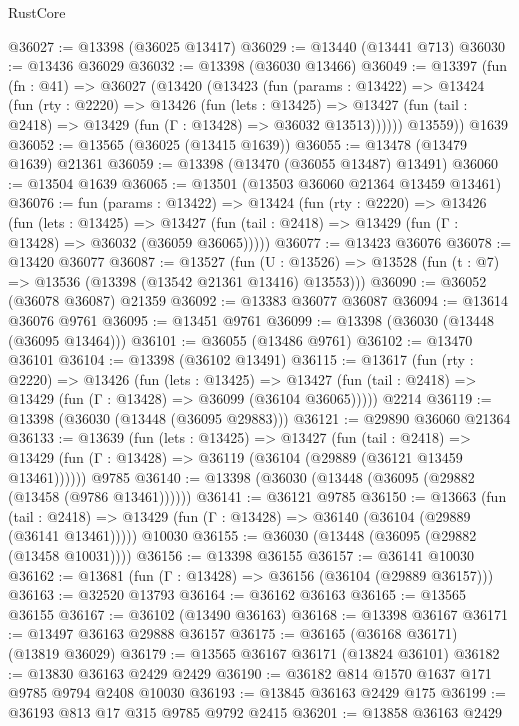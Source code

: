 \begin{lexlean}{RustCore}
\begin{coremodule}
@36027 := @13398 (@36025 @13417)
@36029 := @13440 (@13441 @713)
@36030 := @13436 @36029
@36032 := @13398 (@36030 @13466)
@36049 := @13397
    (fun (fn : @41) =>
    @36027
      (@13420
        (@13423
          (fun (params : @13422) =>
          @13424
            (fun (rty : @2220) =>
            @13426
              (fun (lets : @13425) =>
              @13427 (fun (tail : @2418) => @13429 (fun (Γ : @13428) => @36032 @13513))))))
        @13559))
    @1639
@36052 := @13565 (@36025 (@13415 @1639))
@36055 := @13478 (@13479 @1639) @21361
@36059 := @13398 (@13470 (@36055 @13487) @13491)
@36060 := @13504 @1639
@36065 := @13501 (@13503 @36060 @21364 @13459 @13461)
@36076 := fun (params : @13422) =>
  @13424
    (fun (rty : @2220) =>
    @13426
      (fun (lets : @13425) =>
      @13427 (fun (tail : @2418) => @13429 (fun (Γ : @13428) => @36032 (@36059 @36065)))))
@36077 := @13423 @36076
@36078 := @13420 @36077
@36087 := @13527
    (fun (U : @13526) => @13528 (fun (t : @7) => @13536 (@13398 (@13542 @21361 @13416) @13553)))
@36090 := @36052 (@36078 @36087) @21359
@36092 := @13383 @36077 @36087
@36094 := @13614 @36076 @9761
@36095 := @13451 @9761
@36099 := @13398 (@36030 (@13448 (@36095 @13464)))
@36101 := @36055 (@13486 @9761)
@36102 := @13470 @36101
@36104 := @13398 (@36102 @13491)
@36115 := @13617
    (fun (rty : @2220) =>
    @13426
      (fun (lets : @13425) =>
      @13427 (fun (tail : @2418) => @13429 (fun (Γ : @13428) => @36099 (@36104 @36065)))))
    @2214
@36119 := @13398 (@36030 (@13448 (@36095 @29883)))
@36121 := @29890 @36060 @21364
@36133 := @13639
    (fun (lets : @13425) =>
    @13427
      (fun (tail : @2418) =>
      @13429 (fun (Γ : @13428) => @36119 (@36104 (@29889 (@36121 @13459 @13461))))))
    @9785
@36140 := @13398 (@36030 (@13448 (@36095 (@29882 (@13458 (@9786 @13461))))))
@36141 := @36121 @9785
@36150 := @13663
    (fun (tail : @2418) => @13429 (fun (Γ : @13428) => @36140 (@36104 (@29889 (@36141 @13461)))))
    @10030
@36155 := @36030 (@13448 (@36095 (@29882 (@13458 @10031))))
@36156 := @13398 @36155
@36157 := @36141 @10030
@36162 := @13681 (fun (Γ : @13428) => @36156 (@36104 (@29889 @36157)))
@36163 := @32520 @13793
@36164 := @36162 @36163
@36165 := @13565 @36155
@36167 := @36102 (@13490 @36163)
@36168 := @13398 @36167
@36171 := @13497 @36163 @29888 @36157
@36175 := @36165 (@36168 @36171) (@13819 @36029)
@36179 := @13565 @36167 @36171 (@13824 @36101)
@36182 := @13830 @36163 @2429 @2429
@36190 := @36182 @814 @1570 @1637 @171 @9785 @9794 @2408 @10030
@36193 := @13845 @36163 @2429 @175
@36199 := @36193 @813 @17 @315 @9785 @9792 @2415
@36201 := @13858 @36163 @2429

\end{coremodule}
\end{lexlean}
